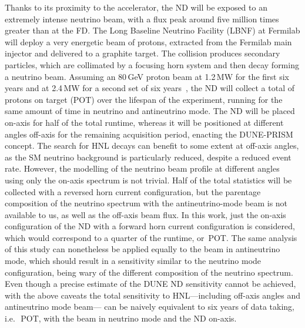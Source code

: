 Thanks to its proximity to the accelerator, the ND will be exposed to an extremely intense neutrino beam, %
with a flux peak around five million times greater than at the FD.
The Long Baseline Neutrino Facility (LBNF) at Fermilab will deploy a very energetic beam of protons, %
extracted from the Fermilab main injector and delivered to a graphite target.
The collision produces secondary particles, which are collimated by a focusing horn system and then decay forming a neutrino beam.
Assuming an 80\,GeV proton beam at 1.2\,MW for the first six years and at 2.4\,MW for a second set of six years~\cite{Abi:2018dnh}, 
the ND will collect a total of  protons on target (POT) over the lifespan of the experiment, %
running for the same amount of time in neutrino and antineutrino mode.
The ND will be placed on-axis for half of the total runtime, whereas it will be positioned %
at different angles off-axis for the remaining acquisition period, enacting the DUNE-PRISM concept.
The search for HNL decays can benefit to some extent at off-axis angles, %
as the SM neutrino background is particularly reduced, despite a reduced event rate.
However, the modelling of the neutrino beam profile at different angles using only the on-axis spectrum is not trivial.
Half of the total statistics will be collected with a reversed horn current configuration, %
but the parentage composition of the neutrino spectrum with the antineutrino-mode beam is not available to us, %
as well as the off-axis beam flux.
In this work, just the on-axis configuration of the ND with a forward horn current configuration is considered, %
which would correspond to a quarter of the runtime, or \,POT.
The same analysis of this study can nonetheless be applied equally to the beam in antineutrino mode, %
which should result in a sensitivity similar to the neutrino mode configuration, %
being wary of the different composition of the neutrino spectrum.
Even though a precise estimate of the DUNE ND sensitivity cannot be achieved, %
with the above caveats the total sensitivity to HNL---including off-axis angles and antineutrino mode beam---%
can be naively equivalent to six years of data taking, i.e.\ \,POT, %
with the beam in neutrino mode and the ND on-axis.


